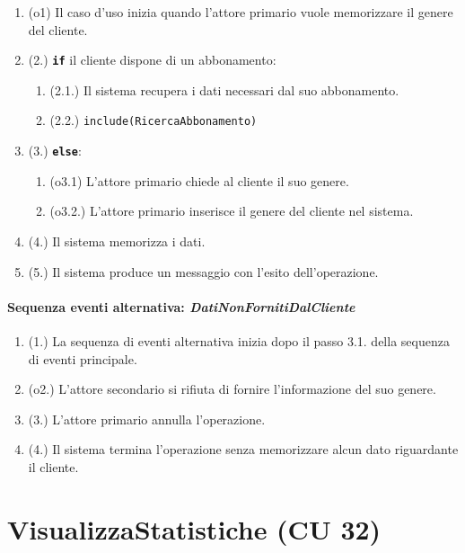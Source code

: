 \documentclass{article}
\begin{document}
	\begin{enumerate}[itemsep=8pt,parsep=0pt]
	    \item(o1) Il caso d'uso inizia quando l'attore primario vuole memorizzare il genere del cliente. 
	    \item(2.) \texttt{\textbf{if}} il cliente dispone di un abbonamento:
			\begin{enumerate}	[leftmargin=28pt]
			\item (2.1.) Il sistema recupera i dati necessari dal suo abbonamento. %
			\item (2.2.) \texttt{{include(RicercaAbbonamento)}}
  			\end{enumerate}
  		\item(3.) \texttt{\textbf{else}}:
  		\begin{enumerate}	[leftmargin=28pt]
	        \item(o3.1) L'attore primario chiede al cliente il suo genere. %
	        \item(o3.2.) L'attore primario inserisce il genere del cliente nel sistema.
	    \end{enumerate}
		\item(4.) Il sistema memorizza i dati.
		\item(5.) Il sistema produce un messaggio con l'esito dell'operazione.
	\end{enumerate}
	
	\paragraph{Sequenza eventi alternativa: \emph{DatiNonFornitiDalCliente}}
		\begin{enumerate}[itemsep=8pt,parsep=0pt]
				\item (1.) La sequenza di eventi alternativa inizia dopo il passo 3.1. della sequenza di eventi principale.
				\item (o2.) L'attore secondario si rifiuta di fornire l'informazione del suo genere.
				\item (3.) L'attore primario annulla l'operazione.
				\item (4.) Il sistema termina l'operazione senza memorizzare alcun dato riguardante il cliente.
		\end{enumerate}
	
	


\newpage	
\section*{VisualizzaStatistiche (CU 32)}
	
\end{document}
